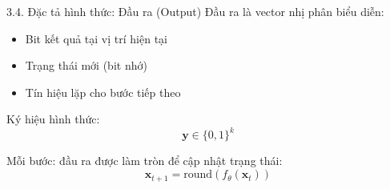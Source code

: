 \documentclass[10pt, aspectratio=169]{beamer}
\begin{document}
\begin{frame}{3.4. Đặc tả hình thức: Đầu ra (Output)}
    Đầu ra là vector nhị phân biểu diễn:
    \begin{itemize}
        \item Bit kết quả tại vị trí hiện tại
        \item Trạng thái mới (bit nhớ)
        \item Tín hiệu lặp cho bước tiếp theo
    \end{itemize}

    \vspace{0.5em}
    Ký hiệu hình thức: \\[0.3em]
    \[
        \mathbf{y} \in \{0,1\}^k
    \]

    \vspace{0.5em}
    Mỗi bước: đầu ra được làm tròn để cập nhật trạng thái:
    \[
        \mathbf{x}_{t+1} = \text{round}(f_\theta(\mathbf{x}_t))
    \]
\end{frame}





\end{document}
